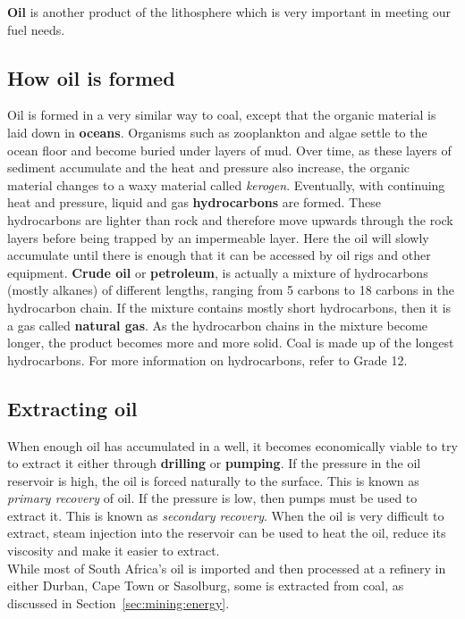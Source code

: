 \textbf{Oil} is another product of the lithosphere which is very important in meeting our fuel needs.

\subsection{How oil is formed}

Oil is formed in a very similar way to coal, except that the organic material is laid down in \textbf{oceans}. Organisms such as zooplankton and algae settle to the ocean floor and become buried under layers of mud. Over time, as these layers of sediment accumulate and the heat and pressure also increase, the organic material changes to a waxy material called \textit{kerogen}. Eventually, with continuing heat and pressure, liquid and gas \textbf{hydrocarbons} are formed. These hydrocarbons are lighter than rock and therefore move upwards through the rock layers before being trapped by an impermeable layer. Here the oil will slowly accumulate until there is enough that it can be accessed by oil rigs and other equipment. \textbf{Crude oil} or \textbf{petroleum}, is actually a mixture of hydrocarbons (mostly alkanes) of different lengths, ranging from 5 carbons to 18 carbons in the hydrocarbon chain. If the mixture contains mostly short hydrocarbons, then it is a gas called \textbf{natural gas}. As the hydrocarbon chains in the mixture become longer, the product becomes more and more solid. Coal is made up of the longest hydrocarbons. For more information on hydrocarbons, refer to Grade 12.

\subsection{Extracting oil}

When enough oil has accumulated in a well, it becomes economically viable to try to extract it either through \textbf{drilling} or \textbf{pumping}. If the pressure in the oil reservoir is high, the oil is forced naturally to the surface. This is known as \textit{primary recovery} of oil. If the pressure is low, then pumps must be used to extract it. This is known as \textit{secondary recovery}. When the oil is very difficult to extract, steam injection into the reservoir can be used to heat the oil, reduce its viscosity and make it easier to extract.\\

While most of South Africa's oil is imported and then processed at a refinery in either Durban, Cape Town or Sasolburg, some is extracted from coal, as discussed in Section~\ref{sec:mining:energy}.



